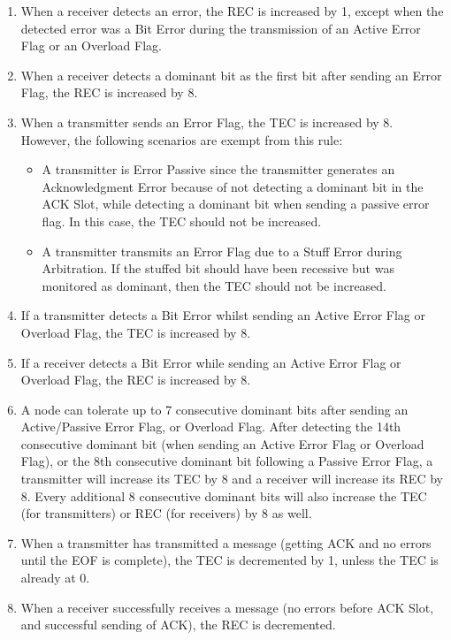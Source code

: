 \documentclass[main\_\_EN.tex]{subfiles}
\begin{document}
\begin{enumerate}
    \item When a receiver detects an error, the REC is increased by 1, except when the detected error was a Bit Error during the transmission of an Active Error Flag or an Overload Flag.
    \item When a receiver detects a dominant bit as the first bit after sending an Error Flag, the REC is increased by 8.
    \item When a transmitter sends an Error Flag, the TEC is increased by 8. However, the following scenarios are exempt from this rule:
    \begin{itemize}
        \item A transmitter is Error Passive since the transmitter generates an Acknowledgment Error because of not detecting a dominant bit in the ACK Slot, while detecting a dominant bit when sending a passive error flag. In this case, the TEC should not be increased.
        \item A transmitter transmits an Error Flag due to a Stuff Error during Arbitration. If the stuffed bit should have been recessive but was monitored as dominant, then the TEC should not be increased.
    \end{itemize}
    \item If a transmitter detects a Bit Error whilst sending an Active Error Flag or Overload Flag, the TEC is increased by 8.
    \item If a receiver detects a Bit Error while sending an Active Error Flag or Overload Flag, the REC is increased by 8.
    \item A node can tolerate up to 7 consecutive dominant bits after sending an Active/Passive Error Flag, or Overload Flag. After detecting the 14th consecutive dominant bit (when sending an Active Error Flag or Overload Flag), or the 8th consecutive dominant bit following a Passive Error Flag, a transmitter will increase its TEC by 8 and a receiver will increase its REC by 8. Every additional 8 consecutive dominant bits will also increase the TEC (for transmitters) or REC (for receivers) by 8 as well.
    \item When a transmitter has transmitted a message (getting ACK and no errors until the EOF is complete), the TEC is decremented by 1, unless the TEC is already at 0.
    \item When a receiver successfully receives a message (no errors before ACK Slot, and successful sending of ACK), the REC is decremented.
    \begin{itemize}

\end{itemize}
\end{enumerate}
\end{document}
